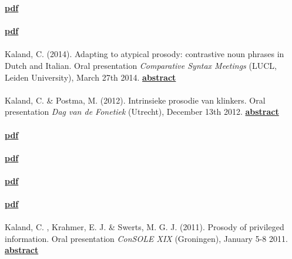 \documentclass[a4paper,11pt]{article}
\begin{document}
 \textcolor{red}{\textbf{\lbrack\href{http://www.isca-speech.org/archive/Interspeech_2016/pdfs/0418.PDF}{pdf}\rbrack}}\\\\
 \textcolor{red}{\textbf{\lbrack\href{http://www.isca-speech.org/archive/tal_2014/papers/tl14_160.pdf}{pdf}\rbrack}}\\\\
Kaland, C. (2014). Adapting to atypical prosody: contrastive noun phrases in Dutch and Italian. Oral presentation \textit{Comparative Syntax Meetings} (LUCL, Leiden University), March 27th 2014. \textcolor{red}{\textbf{\lbrack\href{http://romancelab.weblog.leidenuniv.nl/2014/03/25/constantijn-kaland-thursday-27-march/}{abstract}\rbrack}}\\\\
Kaland, C. \& Postma, M. (2012). Intrinsieke prosodie van klinkers. Oral presentation \textit{Dag van de Fonetiek} (Utrecht), December 13th 2012. \textcolor{red}{\textbf{\lbrack\href{http://www.fon.hum.uva.nl/FonetischeVereniging/DvdFonetiek/DagvdFonetiek2012abstracts.html\#pres11}{abstract}\rbrack}}\\\\
 \textcolor{red}{\textbf{\lbrack\href{http://www.isca-speech.org/archive/archive_papers/interspeech_2012/i12_1047.pdf}{pdf}\rbrack}}\\\\
 \textcolor{red}{\textbf{\lbrack\href{http://isle.illinois.edu/sprosig/sp2012/uploadfiles/file/sp2012_submission_115.pdf}{pdf}\rbrack}}\\\\
 \textcolor{red}{\textbf{\lbrack\href{https://www.internationalphoneticassociation.org/icphs-proceedings/ICPhS2011/OnlineProceedings/RegularSession/Kaland/Kaland.pdf}{pdf}\rbrack}}\\\\
 \textcolor{red}{\textbf{\lbrack\href{https://mindmodeling.org/cogsci2011/papers/0051/paper0051.pdf}{pdf}\rbrack}}\\\\
Kaland, C. , Krahmer, E. J. \& Swerts, M. G. J. (2011). Prosody of privileged information. Oral presentation \textit{ConSOLE XIX} (Groningen), January 5-8 2011. \textcolor{red}{\textbf{\lbrack\href{http://www.let.rug.nl/console19/abstracts/Kaland-Krahmer-Swerts.pdf}{abstract}\rbrack}}\\\\
\end{document}
